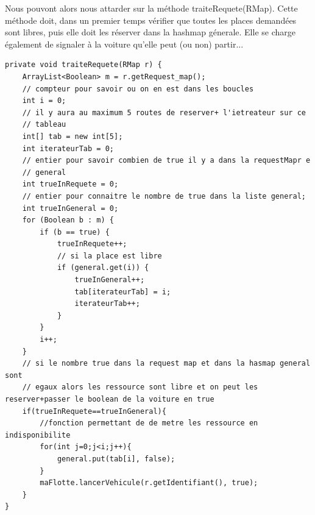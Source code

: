 \documentclass[a4paper, titlepage]{report}
\begin{document}
Nous pouvont alors nous attarder sur la méthode traiteRequete(RMap). Cette méthode doit, dans un premier temps vérifier que toutes les places demandées sont libres, puis elle doit les réserver dans la hashmap génerale. Elle se charge également de signaler à la voiture qu'elle peut (ou non) partir...
\begin{lstlisting}
private void traiteRequete(RMap r) {
	ArrayList<Boolean> m = r.getRequest_map();
	// compteur pour savoir ou on en est dans les boucles
	int i = 0;
	// il y aura au maximum 5 routes de reserver+ l'ietreateur sur ce
	// tableau
	int[] tab = new int[5];
	int iterateurTab = 0;
	// entier pour savoir combien de true il y a dans la requestMapr e
	// general
	int trueInRequete = 0;
	// entier pour connaitre le nombre de true dans la liste general;
	int trueInGeneral = 0;
	for (Boolean b : m) {
		if (b == true) {
			trueInRequete++;
			// si la place est libre
			if (general.get(i)) {
				trueInGeneral++;
				tab[iterateurTab] = i;
				iterateurTab++;
			}
		}
		i++;
	}
	// si le nombre true dans la request map et dans la hasmap general sont
	// egaux alors les ressource sont libre et on peut les reserver+passer le boolean de la voiture en true
	if(trueInRequete==trueInGeneral){
		//fonction permettant de de metre les ressource en indisponibilite
		for(int j=0;j<i;j++){
			general.put(tab[i], false);
		}
		maFlotte.lancerVehicule(r.getIdentifiant(), true);	
	}
}
\end{lstlisting}
\end{document}
